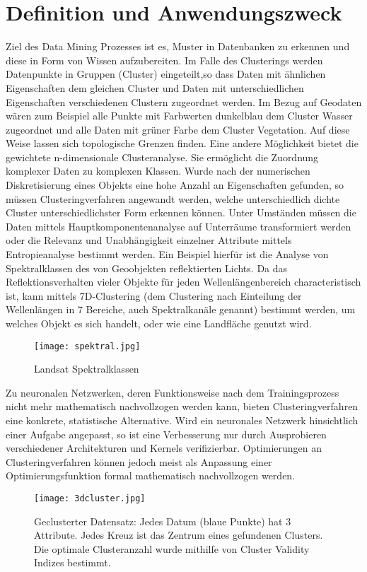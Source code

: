 \documentclass[11pt,ceqn]{book}
\begin{document}
\section{Definition und Anwendungszweck}
Ziel des Data Mining Prozesses ist es, Muster in Datenbanken zu erkennen und diese in Form von Wissen aufzubereiten. Im Falle des Clusterings werden Datenpunkte in Gruppen (Cluster) eingeteilt,so dass Daten mit ähnlichen Eigenschaften dem gleichen Cluster und Daten mit unterschiedlichen Eigenschaften verschiedenen Clustern zugeordnet werden. Im Bezug auf Geodaten wären zum Beispiel alle Punkte mit Farbwerten dunkelblau dem Cluster Wasser zugeordnet und alle Daten mit grüner Farbe dem Cluster Vegetation. Auf diese Weise lassen sich topologische Grenzen finden. Eine andere Möglichkeit bietet die gewichtete n-dimensionale Clusteranalyse. Sie ermöglicht die Zuordnung komplexer Daten zu komplexen Klassen. Wurde nach der numerischen Diskretisierung eines Objekts eine hohe Anzahl an Eigenschaften gefunden, so müssen Clusteringverfahren angewandt werden, welche unterschiedlich dichte Cluster unterschiedlichster Form erkennen können. Unter Umständen müssen die Daten mittels Hauptkomponentenanalyse auf Unterräume transformiert werden oder die Relevanz und Unabhängigkeit einzelner Attribute mittels Entropieanalyse bestimmt werden. Ein Beispiel hierfür ist die Analyse von Spektralklassen des von Geoobjekten reflektierten Lichts. Da das Reflektionsverhalten vieler Objekte für jeden Wellenlängenbereich characteristisch ist, kann mittels 7D-Clustering (dem Clustering nach Einteilung der Wellenlängen in 7 Bereiche, auch Spektralkanäle genannt) bestimmt werden, um welches Objekt es sich handelt, oder wie eine Landfläche genutzt wird. \newpage
\begin{figure}[H]
\centering
\texttt{[image: spektral.jpg]}
\caption{Landsat Spektralklassen \protect\footnotemark}
\end{figure}
Zu neuronalen Netzwerken, deren Funktionsweise nach dem Trainingsprozess nicht mehr mathematisch nachvollzogen werden kann, bieten Clusteringverfahren eine konkrete, statistische Alternative. Wird ein neuronales Netzwerk hinsichtlich einer Aufgabe angepasst, so ist eine Verbesserung nur durch Ausprobieren verschiedener Architekturen und Kernels verifizierbar. Optimierungen an Clusteringverfahren können jedoch meist als Anpassung einer Optimierungsfunktion formal mathematisch nachvollzogen werden.

\begin{figure}[H]
\centering
\texttt{[image: 3dcluster.jpg]}
\caption{Geclusterter Datensatz: Jedes Datum (blaue Punkte) hat 3 Attribute. Jedes Kreuz ist das Zentrum eines gefundenen Clusters. Die optimale Clusteranzahl wurde mithilfe von Cluster Validity Indizes bestimmt.}\label{cluster}
\end{figure}
\end{document}
